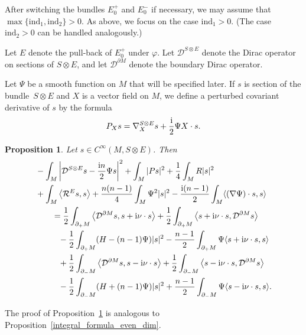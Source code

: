 \documentclass[pdftex]{sigma}
\numberwithin{equation}{section}
\newtheorem{Proposition}[Theorem]{Proposition}
 { \theoremstyle{definition}
\newtheorem{Definition}[Theorem]{Definition}
\newtheorem{Note}[Theorem]{Note}
\newtheorem{Example}[Theorem]{Example}
\newtheorem{Remark}[Theorem]{Remark} }
\begin{document}
After switching the bundles $E_0^+$ and $E_0^-$ if necessary, we may assume that ${\max \{\mathrm{ind}_1,\mathrm{ind}_2\} \!> 0}$.
As above, we focus on the case $\mathrm{ind}_1 > 0$.
(The case $\mathrm{ind}_2 > 0$ can be handled analogously.)

Let $E$ denote the pull-back of $E_0^+$ under $\varphi$. Let $\mathcal{D}^{S \otimes E}$ denote the Dirac operator on sections of $S \otimes E$, and let $\mathcal{D}^{\partial M}$ denote the boundary Dirac operator.

Let $\Psi$ be a smooth function on $M$ that will be specified later. If $s$ is section of the bundle~${S \otimes E}$ and $X$ is a vector field on $M$, we define a perturbed covariant derivative of $s$ by the formula
\[
 P_X s = \nabla_{X}^{S \otimes E}s + \frac{\rm i}{2} \Psi X \cdot s.
\]

\begin{Proposition}
\label{integral_formula_odd_dim}
Let $s \in C^\infty(M,S \otimes E)$.
Then
\begin{align*}
&- \int_M \left|\mathcal{D}^{S \otimes E} s - \frac{{\rm i}n}{2} \Psi s\right|^2 + \int_M |Ps|^2 + \frac{1}{4} \int_M R |s|^2 \\
&+ \int_M \big\langle \mathcal{R}^E s,s \big\rangle + \frac{n(n-1)}{4} \int_M \Psi^2 |s|^2 - \frac{{\rm i}(n-1)}{2} \int_M \langle (\nabla \Psi) \cdot s,s \rangle \\
&\qquad= \frac{1}{2} \int_{\partial_+ M} \big\langle \mathcal{D}^{\partial M} s,s + {\rm i} \nu \cdot s \big\rangle + \frac{1}{2} \int_{\partial_+ M} \big\langle s + {\rm i} \nu \cdot s,\mathcal{D}^{\partial M} s \big\rangle \\
&\phantom{\qquad=}{} - \frac{1}{2} \int_{\partial_+ M} (H-(n-1)\Psi) |s|^2 - \frac{n-1}{2} \int_{\partial_+ M} \Psi \langle s + {\rm i} \nu \cdot s,s \rangle \\
&\phantom{\qquad=}{} + \frac{1}{2} \int_{\partial_- M} \big\langle \mathcal{D}^{\partial M} s,s - {\rm i} \nu \cdot s \big\rangle + \frac{1}{2} \int_{\partial_- M} \big\langle s - {\rm i} \nu \cdot s,\mathcal{D}^{\partial M} s \big\rangle \\
&\phantom{\qquad=}{} - \frac{1}{2} \int_{\partial_- M} (H+(n-1)\Psi) |s|^2 + \frac{n-1}{2} \int_{\partial_- M} \Psi \langle s - {\rm i} \nu \cdot s,s \rangle.
\end{align*}
\end{Proposition}

The proof of Proposition~\ref{integral_formula_odd_dim} is analogous to Proposition~\ref{integral_formula_even_dim}.
\end{document}
